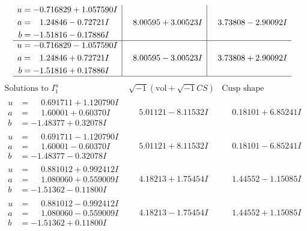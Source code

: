 \documentclass[1p]{elsarticle_modified}
\theoremstyle{definition}
\newcommand{\I}{\sqrt{-1}}
\begin{document}
$$\begin{array}{c|c|c}
\begin{aligned}
u &= -0.716829 + 1.057590 I \\
a &= \phantom{-}1.24846 - 0.72721 I \\
b &= -1.51816 - 0.17886 I\end{aligned}
 & \phantom{-}8.00595 + 3.00523 I & \phantom{-}3.73808 - 2.90092 I \\ \hline\begin{aligned}
u &= -0.716829 - 1.057590 I \\
a &= \phantom{-}1.24846 + 0.72721 I \\
b &= -1.51816 + 0.17886 I\end{aligned}
 & \phantom{-}8.00595 - 3.00523 I & \phantom{-}3.73808 + 2.90092 I\\
 \hline 
 \end{array}$$\newpage$$\begin{array}{c|c|c}  
\text{Solutions to }I^u_{1}& \I (\text{vol} + \sqrt{-1}CS) & \text{Cusp shape}\\
 \hline 
\begin{aligned}
u &= \phantom{-}0.691711 + 1.120790 I \\
a &= \phantom{-}1.60001 + 0.60370 I \\
b &= -1.48377 + 0.32078 I\end{aligned}
 & \phantom{-}5.01121 - 8.11532 I & \phantom{-}0.18101 + 6.85241 I \\ \hline\begin{aligned}
u &= \phantom{-}0.691711 - 1.120790 I \\
a &= \phantom{-}1.60001 - 0.60370 I \\
b &= -1.48377 - 0.32078 I\end{aligned}
 & \phantom{-}5.01121 + 8.11532 I & \phantom{-}0.18101 - 6.85241 I \\ \hline\begin{aligned}
u &= \phantom{-}0.881012 + 0.992412 I \\
a &= \phantom{-}1.080060 + 0.559009 I \\
b &= -1.51362 - 0.11800 I\end{aligned}
 & \phantom{-}4.18213 + 1.75454 I & \phantom{-}1.44552 - 1.15085 I \\ \hline\begin{aligned}
u &= \phantom{-}0.881012 - 0.992412 I \\
a &= \phantom{-}1.080060 - 0.559009 I \\
b &= -1.51362 + 0.11800 I\end{aligned}
 & \phantom{-}4.18213 - 1.75454 I & \phantom{-}1.44552 + 1.15085 I \\ \hline\begin{aligned}

\end{aligned}
\end{array}$$
\end{document}
